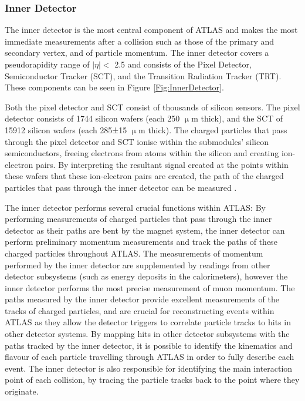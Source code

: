\documentclass[12pt,a4paper,epsf,portrait,times,epsfig]{article}
\begin{document}
		\subsubsection{Inner Detector}
		
		The inner detector is the most central component of ATLAS and makes the most immediate measurements after a collision such as those of the primary and secondary vertex, and of particle momentum. The inner detector covers a pseudorapidity range of $|\eta| <$ 2.5	and consists of the Pixel Detector, Semiconductor Tracker (SCT), and the Transition
		Radiation Tracker (TRT). These components can be seen in Figure \ref{Fig:InnerDetector}. \par
		
		Both the pixel detector and SCT consist of thousands of silicon sensors. The pixel detector consists of 1744 silicon wafers (each 250 $\upmu$m thick), and the SCT of 15912 silicon wafers (each 285±15 $\upmu$m thick). The charged particles that pass through the pixel detector and SCT ionise within the submodules’ silicon semiconductors, freeing electrons from atoms within the silicon and creating ion-electron pairs. By interpreting the resultant signal created at the points within these wafers that these ion-electron pairs are created, the path of the charged particles that pass through the inner detector can be measured 
		\cite{ATLAS-TDR-01, ATLAS-TDR-02, Article:ATLASDesignPaper}.
		\par
		
		

		
		
		 The inner detector performs several crucial functions within ATLAS: By performing measurements of charged particles that pass through the inner detector as their paths are bent by the magnet system, the inner detector can perform preliminary momentum measurements and track the paths of these charged particles throughout ATLAS. The measurements of momentum performed by the inner detector are supplemented by readings from other detector subsystems (such as energy deposits in the calorimeters), however the inner detector performs the most precise measurement of muon momentum. The paths measured by the inner detector provide excellent measurements of the tracks of charged particles, and are crucial for reconstructing events within ATLAS as they allow the detector triggers to correlate particle tracks to hits in other detector systems. By mapping hits in other detector subsystems with the paths tracked by the inner detector, it is possible to identify the kinematics and flavour of each particle travelling through ATLAS in order to fully describe each event. The inner detector is also responsible	for identifying the main interaction point of each collision, by tracing the particle tracks back to the point where they originate. \par
		
\end{document}
